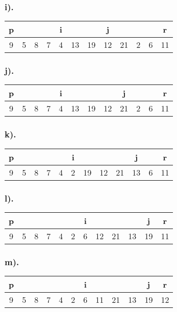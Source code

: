 \documentclass[11pt,letterpaper]{article}
\begin{document}
\subsubsection*{i).}
\begin{tabular}{ | c | c | c | c | c | c | c | c | c | c | c | c | }
		p	&		&		&		&	i	&		&		&	j	&		&		&		&	r	\\
	\hline
		9	&	5	&	8	&	7	&	4	&	13	&	19	&	12	&	21	&	2	&	6	&	11	\\
	\hline
\end{tabular}

\subsubsection*{j).}
\begin{tabular}{ | c | c | c | c | c | c | c | c | c | c | c | c | }
		p	&		&		&		&	i	&		&		&		&	j	&		&		&	r	\\
	\hline
		9	&	5	&	8	&	7	&	4	&	13	&	19	&	12	&	21	&	2	&	6	&	11	\\
	\hline
\end{tabular}

\subsubsection*{k).}
\begin{tabular}{ | c | c | c | c | c | c | c | c | c | c | c | c | }
		p	&		&		&		&		&	i	&		&		&		&	j	&		&	r	\\
	\hline
		9	&	5	&	8	&	7	&	4	&	2	&	19	&	12	&	21	&	13	&	6	&	11	\\
	\hline
\end{tabular}

\subsubsection*{l).}
\begin{tabular}{ | c | c | c | c | c | c | c | c | c | c | c | c | }
		p	&		&		&		&		&		&	i	&		&		&		&	j	&	r	\\
	\hline
		9	&	5	&	8	&	7	&	4	&	2	&	6	&	12	&	21	&	13	&	19	&	11	\\
	\hline
\end{tabular}

\subsubsection*{m).}
\begin{tabular}{ | c | c | c | c | c | c | c | c | c | c | c | c | }
		p	&		&		&		&		&		&	i	&		&		&		&	j	&	r	\\
	\hline
		9	&	5	&	8	&	7	&	4	&	2	&	6	&	11	&	21	&	13	&	19	&	12	\\
	\hline
\end{tabular}
\end{document}
